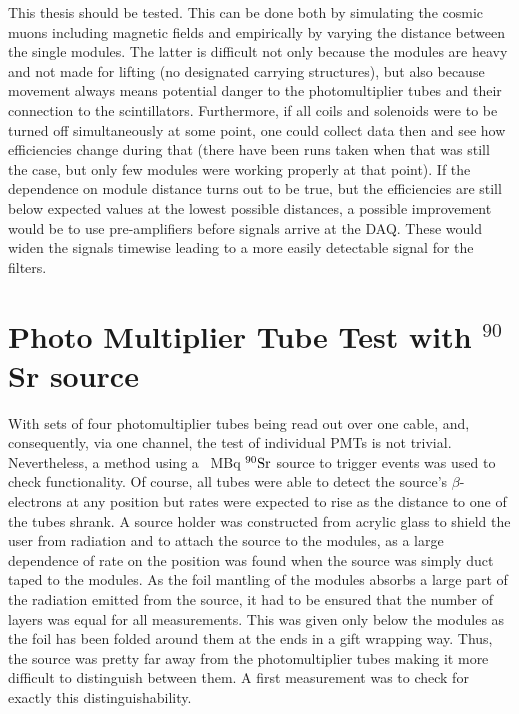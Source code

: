   This thesis should be tested. This can be done both by simulating the cosmic muons including magnetic fields and empirically by varying the distance between the single modules. The latter is difficult not only because the modules are heavy and not made for lifting (no designated carrying structures), but also because movement always means potential danger to the photomultiplier tubes and their connection to the scintillators.
  Furthermore, if all coils and solenoids were to be turned off simultaneously at some point, one could collect data then and see how efficiencies change during that (there have been runs taken when that was still the case, but only few modules were working properly at that point).
  If the dependence on module distance turns out to be true, but the efficiencies are still below expected values at the lowest possible distances, a possible improvement would be to use pre-amplifiers before signals arrive at the DAQ. These would widen the signals timewise leading to a more easily detectable signal for the filters.
  
  \section{Photo Multiplier Tube Test with $^{90}$Sr source}
  \label{ch:Analysis:sec:PhotoMultiplierTests}
  
  With sets of four photomultiplier tubes being read out over one cable, and, consequently, via one channel, the test of individual PMTs is not trivial. Nevertheless, a method using a \SI{}{\mega\becquerel} $\rm ^{90}Sr$ source to trigger events was used to check functionality. Of course, all tubes were able to detect the source's $\beta$-electrons at any position but rates were expected to rise as the distance to one of the tubes shrank. A source holder was constructed from acrylic glass to shield the user from radiation and to attach the source to the modules, as a large dependence of rate on the position was found when the source was simply duct taped to the modules. As the foil mantling of the modules absorbs a large part of the radiation emitted from the source, it had to be ensured that the number of layers was equal for all measurements. This was given only below the modules as the foil has been folded around them at the ends in a gift wrapping way. Thus, the source was pretty far away from the photomultiplier tubes making it more difficult to distinguish between them. A first measurement was to check for exactly this distinguishability.


